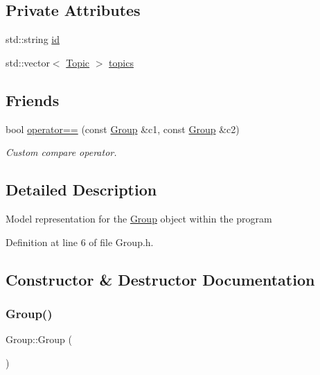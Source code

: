\subsection*{Private Attributes}
\begin{DoxyCompactItemize}
\item 
std\+::string \hyperlink{class_group_ade135fec88f463adb44f780cb476e7d3}{id}
\item 
std\+::vector$<$ \hyperlink{class_topic}{Topic} $>$ \hyperlink{class_group_a5927c259318d2058c9d1573110718bb5}{topics}
\end{DoxyCompactItemize}
\subsection*{Friends}
\begin{DoxyCompactItemize}
\item 
bool \hyperlink{class_group_a5127806edb762fcce6c5450dcb17a395}{operator==} (const \hyperlink{class_group}{Group} \&c1, const \hyperlink{class_group}{Group} \&c2)
\begin{DoxyCompactList}\small\item\em Custom compare operator. \end{DoxyCompactList}\end{DoxyCompactItemize}


\subsection{Detailed Description}
Model representation for the \hyperlink{class_group}{Group} object within the program 

Definition at line 6 of file Group.\+h.



\subsection{Constructor \& Destructor Documentation}
\mbox{\label{class_group_a7b74f9ac68e0504ccf2e2854b7355ff1}} 
\subsubsection{\texorpdfstring{Group()}{Group()}\hspace{0.1cm}{\footnotesize\ttfamily [1/2]}}
{\footnotesize\ttfamily Group\+::\+Group (\begin{DoxyParamCaption}{ }\end{DoxyParamCaption})}



